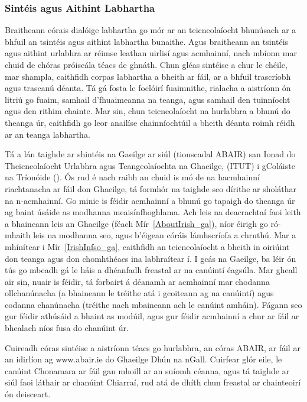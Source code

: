 \begin{multicols}{2}
\subsubsection*{Sintéis agus Aithint Labhartha}
Braitheann córais dialóige labhartha go mór ar an teicneolaíocht bhunúsach ar a bhfuil an tsintéis agus aithint labhartha bunaithe. Agus braitheann an tsintéis agus aithint urlabhra ar réimse leathan uirlisí agus acmhainní, nach mbíonn mar chuid de chóras próiseála téacs de ghnáth. Chun gléas sintéise a chur le chéile, mar shampla, caithfidh corpas labhartha a bheith ar fáil, ar a bhfuil trascríobh agus trascanú déanta. Tá gá fosta le foclóirí fuaimnithe, rialacha a aistríonn ón litriú go fuaim, samhail d’fhuaimeanna na teanga, agus samhail den tuinníocht agus den rithim chainte. Mar sin, chun teicneolaíocht na hurlabhra a bhunú do theanga úr, caithfidh go leor anailíse chainníochtúil a bheith déanta roimh réidh ar an teanga labhartha.

Tá a lán taighde ar shintéis na Gaeilge ar siúl (tionscadal ABAIR) san Ionad do Theicneolaíocht Urlabhra agus Teangeolaíochta na Ghaeilge, (ITUT) i gColáiste na Tríonóide (\cite{pittsburgh}). Ós rud é nach raibh an chuid is mó de na hacmhainní riachtanacha ar fáil don Ghaeilge, tá formhór na taighde seo dírithe ar sholáthar na n-acmhainní. Go minic is féidir acmhainní a bhunú go tapaigh do theanga úr ag baint úsáide as modhanna meaisínfhoghlama. Ach leis na deacrachtaí faoi leith a bhaineann leis an Ghaeilge (féach Mír~\ref{AboutIrish_ga}), níor éirigh go ró-mhaith leis na modhanna seo, agus b’éigean córáis lámhscríofa a chruthú. Mar a mhínítear i Mír~\ref{IrishInfso_ga}, caithfidh an teicneolaíocht a bheith in oiriúint don teanga agus don chomhthéacs ina labhraítear í. I gcás na Gaeilge, ba léir ón tús go mbeadh gá le háis a dhéanfadh freastal ar na canúintí éagsúla. Mar gheall air sin, nuair is féidir, tá forbairt á déanamh ar acmhainní mar chodanna ollchanúnacha (a bhaineann le tréithe atá i gcoiteann ag na canúintí) agus codanna chanúnacha (tréithe nach mbaineann ach le canúint amháin). Fágann seo gur féidir athúsáid a bhaint as modúil, agus gur féidir acmhainní a chur ar fáil ar bhealach níos fusa do chanúint úr.

Cuireadh córas sintéise a aistríonn téacs go hurlabhra, an córas ABAIR, ar fáil ar an idirlíon ag www.abair.ie do Ghaeilge Dhún na nGall. Cuirfear glór eile, le canúint Chonamara ar fáil gan mhoill ar an suíomh céanna, agus tá taighde ar siúl faoi láthair ar chanúint Chiarraí, rud atá de dhíth chun freastal ar chainteoirí ón deisceart.


\end{multicols}
